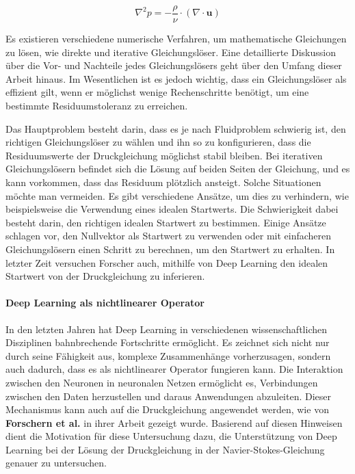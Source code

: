 \begin{equation}
\nabla^2 p = -\frac{\rho}{\nu} \cdot \left(\nabla \cdot \mathbf{u} \right)\label{eq:poisson_pressure}
\end{equation}

Es existieren verschiedene numerische Verfahren, um mathematische Gleichungen zu lösen, wie direkte und iterative Gleichungslöser. Eine detaillierte Diskussion über die Vor- und Nachteile jedes Gleichungslösers geht über den Umfang dieser Arbeit hinaus. Im Wesentlichen ist es jedoch wichtig, dass ein Gleichungslöser als effizient gilt, wenn er möglichst wenige Rechenschritte benötigt, um eine bestimmte Residuumstoleranz zu erreichen.

Das Hauptproblem besteht darin, dass es je nach Fluidproblem schwierig ist, den richtigen Gleichungslöser zu wählen und ihn so zu konfigurieren, dass die Residuumswerte der Druckgleichung möglichst stabil bleiben. Bei iterativen Gleichungslösern befindet sich die Lösung auf beiden Seiten der Gleichung, und es kann vorkommen, dass das Residuum plötzlich ansteigt. Solche Situationen möchte man vermeiden. Es gibt verschiedene Ansätze, um dies zu verhindern, wie beispielsweise die Verwendung eines idealen Startwerts. Die Schwierigkeit dabei besteht darin, den richtigen idealen Startwert zu bestimmen. Einige Ansätze schlagen vor, den Nullvektor als Startwert zu verwenden oder mit einfacheren Gleichungslösern einen Schritt zu berechnen, um den Startwert zu erhalten. In letzter Zeit versuchen Forscher auch, mithilfe von Deep Learning den idealen Startwert von der Druckgleichung zu inferieren.

\paragraph{Deep Learning als nichtlinearer Operator}
In den letzten Jahren hat Deep Learning in verschiedenen wissenschaftlichen Disziplinen bahnbrechende Fortschritte ermöglicht. Es zeichnet sich nicht nur durch seine Fähigkeit aus, komplexe Zusammenhänge vorherzusagen, sondern auch dadurch, dass es als nichtlinearer Operator fungieren kann. Die Interaktion zwischen den Neuronen in neuronalen Netzen ermöglicht es, Verbindungen zwischen den Daten herzustellen und daraus Anwendungen abzuleiten. Dieser Mechanismus kann auch auf die Druckgleichung angewendet werden, wie von \textbf{Forschern et al.} in ihrer Arbeit gezeigt wurde. Basierend auf diesen Hinweisen dient die Motivation für diese Untersuchung dazu, die Unterstützung von Deep Learning bei der Lösung der Druckgleichung in der Navier-Stokes-Gleichung genauer zu untersuchen.

